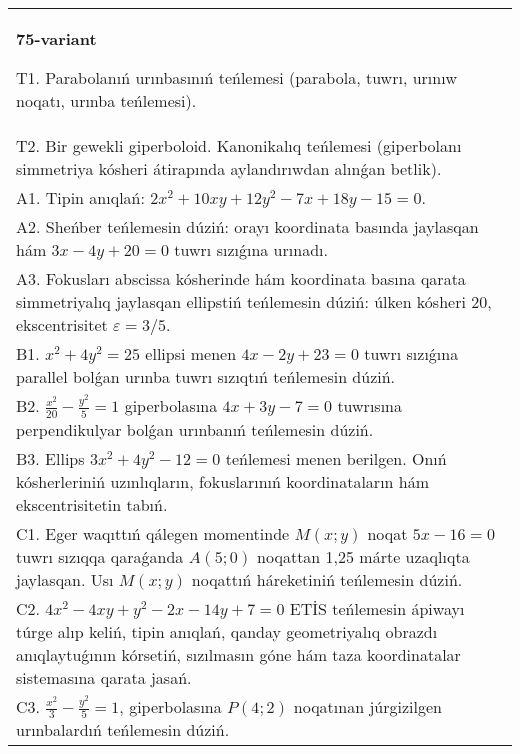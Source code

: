 \documentclass{article}
\begin{document}
\begin{tabular}{m{17cm}}
\textbf{75-variant}
\newline

T1. Parabolanıń urınbasınıń teńlemesi (parabola, tuwrı, urınıw noqatı, urınba teńlemesi).\\

T2. Bir gewekli giperboloid. Kanonikalıq teńlemesi (giperbolanı simmetriya kósheri átirapında aylandırıwdan alınǵan betlik).\\

A1. Tipin anıqlań: $2 x^{2}+10 xy+12 y^{2}-7 x+18 y-15=0$.\\

A2. Sheńber teńlemesin dúziń: orayı koordinata basında jaylasqan hám $3 x-4 y+20=0$ tuwrı sızıǵına urınadı.\\

A3. Fokusları abscissa kósherinde hám koordinata basına qarata simmetriyalıq jaylasqan ellipstiń teńlemesin dúziń: úlken kósheri $20$, ekscentrisitet $\varepsilon=3/5$.\\

B1. $x^{2} + 4y^{2} = 25$ ellipsi menen $4x - 2y + 23 = 0$ tuwrı sızıǵına parallel bolǵan urınba tuwrı sızıqtıń teńlemesin dúziń.  \\

B2. $\frac{x^{2}}{20} - \frac{y^{2}}{5} = 1$ giperbolasına $4x + 3y - 7 = 0$ tuwrısına perpendikulyar bolǵan urınbanıń teńlemesin dúziń.  \\

B3. Ellips $3x^{2} + 4y^{2} - 12 = 0$ teńlemesi menen berilgen. Onıń kósherleriniń uzınlıqların, fokuslarınıń koordinataların hám ekscentrisitetin tabıń.  \\

C1. Eger waqıttıń qálegen momentinde $M(x;y)$ noqat $5x - 16 = 0$ tuwrı sızıqqa qaraǵanda $A(5;0)$ noqattan 1,25 márte uzaqlıqta jaylasqan. Usı $M(x;y)$ noqattıń háreketiniń teńlemesin dúziń.  \\

C2. $4x^{2} - 4xy + y^{2} - 2x - 14y + 7 = 0$ ETİS teńlemesin ápiwayı túrge alıp keliń, tipin anıqlań, qanday geometriyalıq obrazdı anıqlaytuǵının kórsetiń, sızılmasın góne hám taza koordinatalar sistemasına qarata jasań.  \\

C3. $\frac{x^{2}}{3} - \frac{y^{2}}{5} = 1$, giperbolasına $P(4;2)$ noqatınan júrgizilgen urınbalardıń teńlemesin dúziń.  \\

\end{tabular}
\vspace{1cm}
\end{document}
